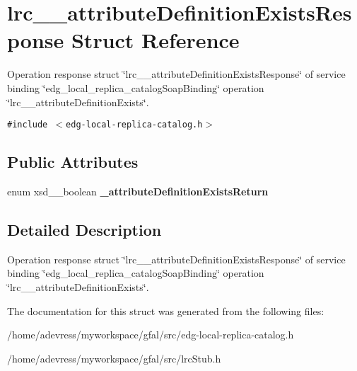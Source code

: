 \section{lrc\_\-\_\-attribute\-Definition\-Exists\-Response Struct Reference}
\label{structlrc____attributeDefinitionExistsResponse}
Operation response struct \char`\"{}lrc\_\-\_\-attribute\-Definition\-Exists\-Response\char`\"{} of service binding \char`\"{}edg\_\-local\_\-replica\_\-catalog\-Soap\-Binding\char`\"{} operation \char`\"{}lrc\_\-\_\-attribute\-Definition\-Exists\char`\"{}.  


{\tt \#include $<$edg-local-replica-catalog.h$>$}

\subsection*{Public Attributes}
\begin{CompactItemize}
\item 
enum xsd\_\-\_\-boolean \textbf{\_\-attribute\-Definition\-Exists\-Return}\label{structlrc____attributeDefinitionExistsResponse_b5147599cc4f1fb1fd023a6990538a32}

\end{CompactItemize}


\subsection{Detailed Description}
Operation response struct \char`\"{}lrc\_\-\_\-attribute\-Definition\-Exists\-Response\char`\"{} of service binding \char`\"{}edg\_\-local\_\-replica\_\-catalog\-Soap\-Binding\char`\"{} operation \char`\"{}lrc\_\-\_\-attribute\-Definition\-Exists\char`\"{}. 



The documentation for this struct was generated from the following files:\begin{CompactItemize}
\item 
/home/adevress/myworkspace/gfal/src/edg-local-replica-catalog.h\item 
/home/adevress/myworkspace/gfal/src/lrc\-Stub.h\end{CompactItemize}
